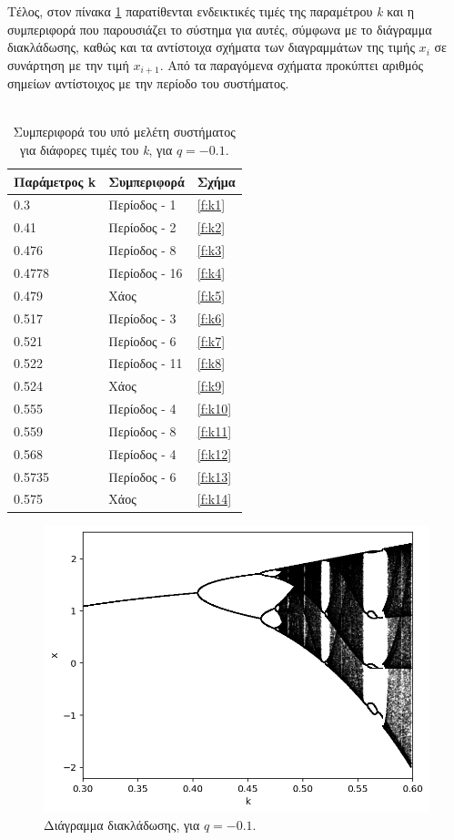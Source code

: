 Τέλος, στον πίνακα \ref{tab:abc} παρατίθενται ενδεικτικές τιμές της παραμέτρου \emph{k} και η συμπεριφορά που παρουσιάζει το σύστημα για αυτές, σύμφωνα με το διάγραμμα διακλάδωσης, καθώς και τα αντίστοιχα σχήματα των διαγραμμάτων της τιμής \(x_i\) σε συνάρτηση με την τιμή \(x_{i+1}\). Από τα παραγόμενα σχήματα προκύπτει αριθμός σημείων αντίστοιχος με την περίοδο του συστήματος.\\\\


\begin{table}[ht]
	\centering
	\caption{Συμπεριφορά του υπό μελέτη συστήματος για διάφορες τιμές του \emph{k}, για $q=-0.1$.}
	\begin{tabular}{l | l | l}
		Παράμετρος k & Συμπεριφορά & Σχήμα\\
		\hline
		0.3 &  Περίοδος - 1 & \ref{f:k1}\\
		0.41 & Περίοδος - 2 & \ref{f:k2}\\
		0.476 &  Περίοδος - 8 & \ref{f:k3}\\
		0.4778 & Περίοδος - 16 & \ref{f:k4}\\
		0.479 & Χάος & \ref{f:k5}\\
		0.517 & Περίοδος - 3 & \ref{f:k6}\\
		0.521 & Περίοδος - 6 & \ref{f:k7}\\
		0.522 & Περίοδος - 11 & \ref{f:k8}\\
		0.524 & Χάος & \ref{f:k9}\\
		0.555 & Περίοδος - 4 & \ref{f:k10}\\
		0.559 & Περίοδος - 8 & \ref{f:k11}\\
		0.568 & Περίοδος - 4 & \ref{f:k12}\\
		0.5735 & Περίοδος - 6 & \ref{f:k13}\\
		0.575 & Χάος & \ref{f:k14}\\
	\end{tabular}
	
	\label{tab:abc}
\end{table}


\begin{figure}[ht]
	\centering
	\includegraphics[width=1\linewidth]{LateX images/graphs/g1}
	\caption{ Διάγραμμα διακλάδωσης, για $q=-0.1$.}
	\label{f:g1}	
\end{figure}

